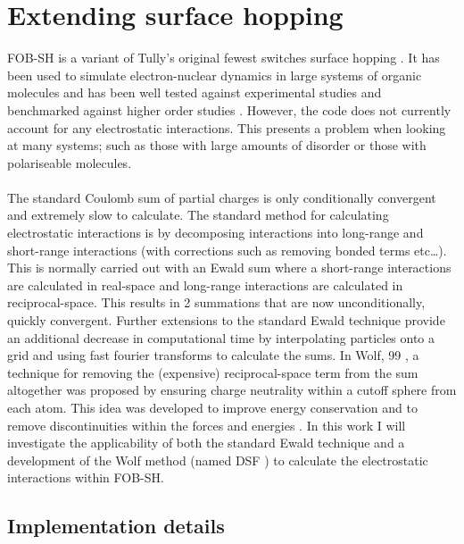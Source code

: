 \chapter{Extending surface hopping}
\label{chap:surface_hopping_ES}

\noindent FOB-SH is a variant of Tully's original fewest switches surface hopping \cite{FSSH_orig}. It has been used to simulate electron-nuclear dynamics in large systems of organic molecules and has been well tested against experimental studies and benchmarked against higher order studies \cite{FlickPolarons, Giannini2018Crossover, Giannini2019,             C9TC05270D, Carof2017FSSH, C9FD00046A, C9CP04770K, FOB-SH_Spencer,        C6FD00107F}. However, the code does not currently account for any electrostatic interactions. This presents a problem when looking at many systems; such as those with large amounts of disorder or those with polariseable molecules. 
\\\\
The standard Coulomb sum of partial charges is only conditionally convergent and extremely slow to calculate. The standard method for calculating electrostatic interactions is by decomposing interactions into long-range and short-range interactions (with corrections such as removing bonded terms etc\ldots). This is normally carried out with an Ewald sum \cite{Ewald} where a short-range interactions are calculated in real-space and long-range interactions are calculated in reciprocal-space. This results in 2 summations that are now unconditionally, quickly convergent. Further extensions to the standard Ewald technique provide an additional decrease in computational time by interpolating particles onto a grid and using fast fourier transforms to calculate the sums. In Wolf, 99 \cite{Wolf99}, a technique for removing the (expensive) reciprocal-space term from the sum altogether was proposed by ensuring charge neutrality within a cutoff sphere from each atom. This idea was developed to improve energy conservation and to remove discontinuities within the forces and energies \cite{Zahn2002, DSF}. In this work I will investigate the applicability of both the standard Ewald technique and a development of the Wolf method (named DSF \cite{DSF}) to calculate the electrostatic interactions within FOB-SH.
\section{Implementation details}

